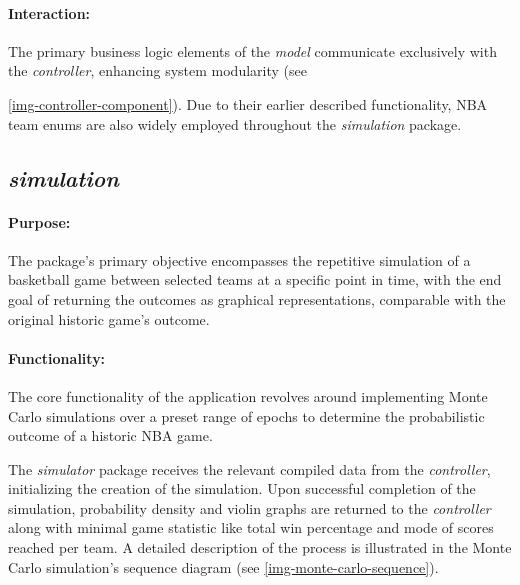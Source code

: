 \documentclass{thesis-ekf}
\theoremstyle{definition}
\theoremstyle{remark}
\begin{document}
\paragraph{Interaction:}
The primary business logic elements of the \emph{model} communicate exclusively with the \emph{controller}, enhancing system modularity (see {\ref{img-controller-component}). Due to their earlier described functionality, NBA team enums are also widely employed throughout the \emph{simulation} package. 

\subsection{\emph{simulation}}
\paragraph{Purpose:}
The package's primary objective encompasses the repetitive simulation of a basketball game between selected teams at a specific point in time, with the end goal of returning the outcomes as graphical representations, comparable with the original historic game's outcome.
\paragraph{Functionality:}
The core functionality of the application revolves around implementing Monte Carlo simulations over a preset range of epochs to determine the probabilistic outcome of a historic NBA game. 

The \emph{simulator} package receives the relevant compiled data from the \emph{controller}, initializing the creation of the simulation. Upon successful completion of the simulation, probability density and violin graphs are returned to the \emph{controller} along with minimal game statistic like total win percentage and mode of scores reached per team. A detailed description of the process is illustrated in the Monte Carlo simulation's sequence diagram (see {\ref{img-monte-carlo-sequence}}).
}
\end{document}
